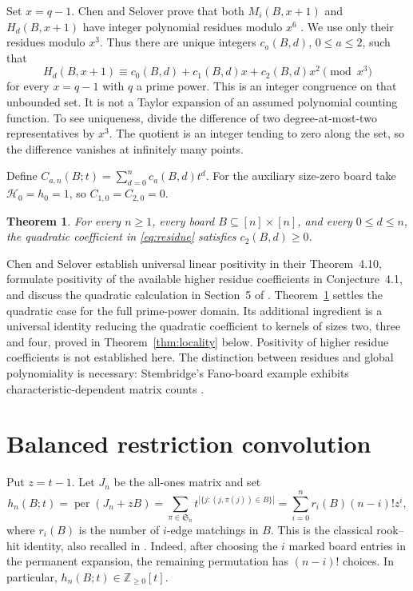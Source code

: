 \documentclass[11pt]{article}
\newtheorem{theorem}{Theorem}
\DeclareMathOperator{\per}{per}
\newcommand{\NN}{\mathbb Z_{\geq0}}
\newcommand{\hit}{\mathcal H}
\begin{document}
Set $x=q-1$. Chen and Selover prove that both $M_i(B,x+1)$ and
$H_d(B,x+1)$ have integer polynomial residues modulo $x^6$
\cite[Corollary~3.13]{ChenSelover2026}. We use only their residues modulo
$x^3$. Thus there are unique integers $c_a(B,d)$, $0\leq a\leq2$, such that
\begin{equation}\label{eq:residue}
 H_d(B,x+1)\equiv c_0(B,d)+c_1(B,d)x+c_2(B,d)x^2\pmod{x^3}
\end{equation}
for every $x=q-1$ with $q$ a prime power. This is an integer congruence on
that unbounded set. It is not a Taylor expansion of an assumed polynomial
counting function. To see uniqueness, divide the difference of two
degree-at-most-two representatives by $x^3$. The quotient is an integer
tending to zero along the set, so the difference vanishes at infinitely
many points.

Define $C_{a,n}(B;t)=\sum_{d=0}^{n}c_a(B,d)t^d$.
For the auxiliary size-zero board take $\hit_0=h_0=1$, so
$C_{1,0}=C_{2,0}=0$.

\begin{theorem}\label{thm:main}
For every $n\geq1$, every board $B\subseteq[n]\times[n]$, and every
$0\leq d\leq n$, the quadratic coefficient in \eqref{eq:residue} satisfies
$c_2(B,d)\geq0$.
\end{theorem}

Chen and Selover establish universal linear positivity in their
Theorem~4.10, formulate positivity of the available higher residue
coefficients in Conjecture~4.1, and discuss the quadratic calculation in
Section~5 of \cite{ChenSelover2026}. Theorem~\ref{thm:main} settles the
quadratic case for the full prime-power domain. Its additional ingredient
is a universal identity reducing the quadratic coefficient to kernels of
sizes two, three and four, proved in Theorem~\ref{thm:locality} below.
Positivity of higher residue coefficients is not established here.
The distinction between residues and global polynomiality is necessary:
Stembridge's Fano-board example exhibits characteristic-dependent matrix
counts \cite[Section~7A]{Stembridge1998}.

\section{Balanced restriction convolution}

Put $z=t-1$. Let $J_n$ be the all-ones matrix and set
\begin{equation}\label{eq:classical}
 h_n(B;t)=\per(J_n+zB)
   =\sum_{\pi\in\mathfrak S_n}t^{|\{j:(j,\pi(j))\in B\}|}
   =\sum_{i=0}^{n}r_i(B)(n-i)!z^i,
\end{equation}
where $r_i(B)$ is the number of $i$-edge matchings in $B$. This is the
classical rook--hit identity, also recalled in
\cite[Eq.~(1.1)]{LewisMorales2020}. Indeed, after choosing the $i$ marked
board entries in the permanent expansion, the remaining permutation has
$(n-i)!$ choices. In particular, $h_n(B;t)\in\NN[t]$.
\end{document}
